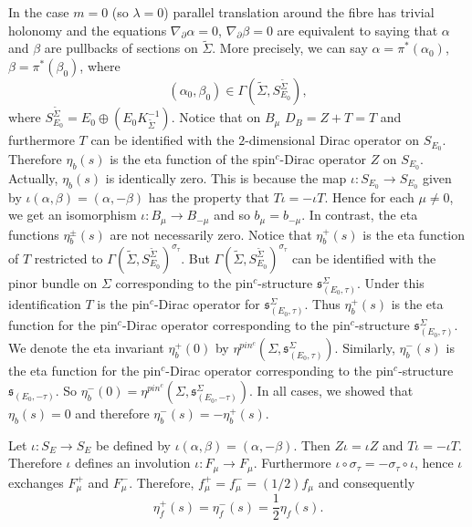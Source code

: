 \documentclass{amsart}
\theoremstyle{definition}
\theoremstyle{remark}
\numberwithin{equation}{section}
\begin{document}
In the case $m = 0$ (so $\lambda = 0$) parallel translation around the fibre has trivial holonomy and the equations $\nabla_\partial \alpha = 0$, $\nabla_\partial \beta = 0$ are equivalent to saying that $\alpha$ and $\beta$ are pullbacks of sections on $\widetilde{\Sigma}$. More precisely, we can say $\alpha = \pi^*(\alpha_0)$, $\beta = \pi^*(\beta_0)$, where
\[
(\alpha_0 , \beta_0) \in \Gamma( \widetilde{\Sigma} , S_{E_0}^{\widetilde{\Sigma}} ),
\]
where $S_{E_0}^{\widetilde{\Sigma}} = E_0 \oplus (E_0 K_{\widetilde{\Sigma}}^{-1})$. Notice that on $B_\mu$ $D_B = Z + T = T$ and furthermore $T$ can be identified with the $2$-dimensional Dirac operator on $S_{E_0}$. Therefore $\eta_b(s)$ is the eta function of the spin$^c$-Dirac operator $Z$ on $S_{E_0}$. Actually, $\eta_b(s)$ is identically zero. This is because the map $\iota : S_{E_0} \to S_{E_0}$ given by $\iota(\alpha , \beta ) = (\alpha , -\beta)$ has the property that $T \iota = -\iota T$. Hence for each $\mu \neq 0$, we get an isomorphism $\iota \colon B_\mu \to B_{-\mu}$ and so $b_\mu = b_{-\mu}$. In contrast, the eta functions $\eta_{b}^{\pm}(s)$ are not necessarily zero. Notice that $\eta_{b}^{+}(s)$ is the eta function of $T$ restricted to $\Gamma( \widetilde{\Sigma} , S_{E_0}^{\widetilde{\Sigma}})^{\sigma_\tau}$. But $\Gamma( \widetilde{\Sigma} , S_{E_0}^{\widetilde{\Sigma}})^{\sigma_\tau}$ can be identified with the pinor bundle on $\Sigma$ corresponding to the pin$^c$-structure $\mathfrak{s}_{(E_0 , \tau)}^{\Sigma}$. Under this identification $T$ is the pin$^c$-Dirac operator for $\mathfrak{s}_{(E_0 , \tau)}^{\Sigma}$. Thus $\eta_b^+(s)$ is the eta function for the pin$^c$-Dirac operator corresponding to the pin$^c$-structure $\mathfrak{s}_{(E_0 , \tau)}^{\Sigma}$. We denote the eta invariant $\eta_b^+(0)$ by $\eta^{pin^c}(\Sigma , \mathfrak{s}_{(E_0 , \tau)}^\Sigma)$. Similarly, $\eta_b^-(s)$ is the eta function for the pin$^c$-Dirac operator corresponding to the pin$^c$-structure $\mathfrak{s}_{(E_0 , -\tau)}$. So $\eta_b^-(0) = \eta^{pin^c}(\Sigma , \mathfrak{s}_{(E_0 , -\tau)}^\Sigma)$. In all cases, we showed that $\eta_b(s) = 0$ and therefore $\eta_b^-(s) = -\eta_b^+(s)$.

Let $\iota \colon S_E \to S_E$ be defined by $\iota(\alpha , \beta) = (\alpha , -\beta)$. Then $Z \iota = \iota Z$ and $T \iota = -\iota T$. Therefore $\iota$ defines an involution $\iota \colon F_\mu \to F_{\mu}$. Furthermore $\iota \circ \sigma_\tau = -\sigma_\tau \circ \iota$, hence $\iota$ exchanges $F_\mu^+$ and $F_\mu^-$. Therefore, $f_\mu^+ = f_\mu^- = (1/2) f_\mu$ and consequently
\[
\eta_f^+(s) = \eta_f^-(s) = \frac{1}{2}\eta_f(s).
\]
\end{document}
